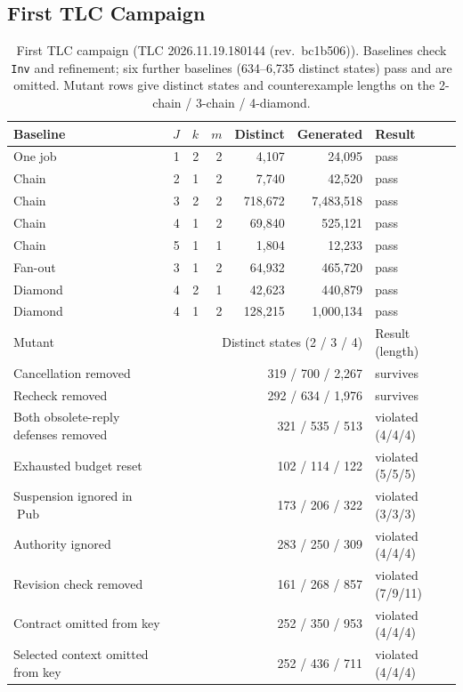\documentclass[pdflatex,sn-mathphys-num]{sn-jnl}
\theoremstyle{thmstyleone}%
\theoremstyle{thmstyletwo}%
\theoremstyle{thmstylethree}%
\newcommand{\Pub}{\operatorname{Pub}}
\newcommand{\TLCExtVersion}{2026.11.19.180144 (rev.\ bc1b506)}
\begin{document}
\begin{appendices}
\section{First TLC Campaign}\label{app:tlc}
\begin{table}[!ht]
\caption{First TLC campaign (TLC \TLCExtVersion). Baselines check \texttt{Inv} and refinement; six further baselines (634--6,735 distinct states) pass and are omitted. Mutant rows give distinct states and counterexample lengths on the 2-chain / 3-chain / 4-diamond.}\label{tab:tlc}
\footnotesize\setlength{\tabcolsep}{3.5pt}
\begin{tabular}{@{}lrrrrrl@{}}\toprule
Baseline & $J$ & $k$ & $m$ & Distinct & Generated & Result\\\midrule
One job & 1 & 2 & 2 & 4,107 & 24,095 & pass\\
Chain & 2 & 1 & 2 & 7,740 & 42,520 & pass\\
Chain & 3 & 2 & 2 & 718,672 & 7,483,518 & pass\\
Chain & 4 & 1 & 2 & 69,840 & 525,121 & pass\\
Chain & 5 & 1 & 1 & 1,804 & 12,233 & pass\\
Fan-out & 3 & 1 & 2 & 64,932 & 465,720 & pass\\
Diamond & 4 & 2 & 1 & 42,623 & 440,879 & pass\\
Diamond & 4 & 1 & 2 & 128,215 & 1,000,134 & pass\\\midrule
Mutant & \multicolumn{5}{r}{Distinct states (2 / 3 / 4)} & Result (length)\\\midrule
Cancellation removed & \multicolumn{5}{r}{319 / 700 / 2,267} & survives\\
Recheck removed & \multicolumn{5}{r}{292 / 634 / 1,976} & survives\\
Both obsolete-reply defenses removed & \multicolumn{5}{r}{321 / 535 / 513} & violated (4/4/4)\\
Exhausted budget reset & \multicolumn{5}{r}{102 / 114 / 122} & violated (5/5/5)\\
Suspension ignored in $\Pub$ & \multicolumn{5}{r}{173 / 206 / 322} & violated (3/3/3)\\
Authority ignored & \multicolumn{5}{r}{283 / 250 / 309} & violated (4/4/4)\\
Revision check removed & \multicolumn{5}{r}{161 / 268 / 857} & violated (7/9/11)\\
Contract omitted from key & \multicolumn{5}{r}{252 / 350 / 953} & violated (4/4/4)\\
Selected context omitted from key & \multicolumn{5}{r}{252 / 436 / 711} & violated (4/4/4)\\
\bottomrule
\end{tabular}
\end{table}

\end{appendices}


\end{document}
